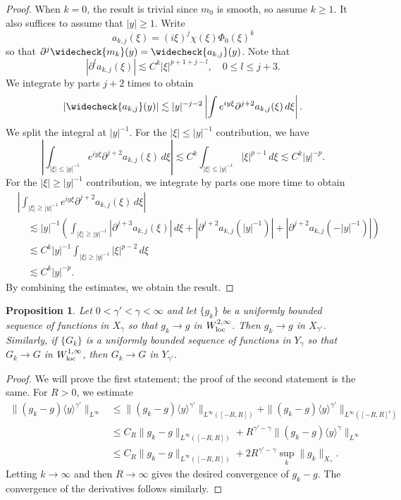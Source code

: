 \documentclass[11pt]{amsart}
\newtheorem{proposition}[theorem]{Proposition}
\theoremstyle{definition}
\theoremstyle{remark}
\numberwithin{equation}{section}
\newcommand{\ang}[1]{\langle #1 \rangle}
\begin{document}
\begin{proof}
    When $k = 0$, the result is trivial since $m_0$ is smooth, so assume $k \geq 1$. It also suffices to assume that $|y| \geq 1$. Write
    \[a_{k,j}(\xi) = (i\xi)^j \chi(\xi)\Phi_0(\xi)^k\]
    so that $\partial^j \widecheck{m_k}(y) = \widecheck{a_{k,j}}(y)$. Note that
    \[|\partial^l a_{k,j}(\xi)| \lesssim C^k |\xi|^{p + 1 + j - l}, \quad 0 \leq l \leq j + 3.\]
    We integrate by parts $j + 2$ times to obtain
    \[|\widecheck{a_{k,j}}(y)| \lesssim |y|^{-j - 2}\left|\int e^{iy\xi}\partial^{j+2}a_{k,j}(\xi)\, d\xi\right|.\]
    We split the integral at $|y|^{-1}$. For the $|\xi| \leq |y|^{-1}$ contribution, we have
    \[\left|\int_{|\xi| \leq |y|^{-1}} e^{iy\xi}\partial^{j+2}a_{k,j}(\xi)\, d\xi\right| \lesssim C^k \int_{|\xi| \leq |y|^{-1}}|\xi|^{p - 1} \, d\xi \lesssim C^k |y|^{-p}.\]
    For the $|\xi| \geq |y|^{-1}$ contribution, we integrate by parts one more time to obtain
    \begin{align*}
        &\left|\int_{|\xi| \geq |y|^{-1}} e^{iy\xi}\partial^{j+2}a_{k,j}(\xi)\, d\xi\right| \\
        &\quad \lesssim |y|^{-1}\left(\int_{|\xi| \geq |y|^{-1}}|\partial^{j+3}a_{k,j}(\xi)|\, d\xi + \left|\partial^{j+2}a_{k,j}(|y|^{-1})\right| + \left|\partial^{j+2}a_{k,j}(-|y|^{-1})\right|\right) \\
        &\quad \lesssim C^k |y|^{-1}\int_{|\xi| \geq |y|^{-1}}|\xi|^{p - 2}\, d\xi \\
        &\quad \lesssim C^k |y|^{-p}.
    \end{align*}
    By combining the estimates, we obtain the result.
\end{proof}

\begin{proposition}\label{prop:appendix_convergence}
    Let $0 < \gamma' < \gamma < \infty$ and let $\{g_k\}$ be a uniformly bounded sequence of functions in $X_{\gamma}$ so that $g_k \to g$ in $W^{2, \infty}_{\textup{loc}}$. Then $g_k \to g$ in $X_{\gamma'}$. Similarly, if $\{G_k\}$ is a uniformly bounded sequence of functions in $Y_{\gamma}$ so that $G_k \to G$ in $W^{1, \infty}_{\textup{loc}}$, then $G_k \to G$ in $Y_{\gamma'}$.
\end{proposition}

\begin{proof}
    We will prove the first statement; the proof of the second statement is the same. For $R > 0$, we estimate
    \begin{align*}
        \|(g_k - g)\ang{y}^{\gamma'}\|_{L^\infty} & \leq \|(g_k - g)\ang{y}^{\gamma'}\|_{L^\infty([-R, R])} + \|(g_k - g)\ang{y}^{\gamma'}\|_{L^\infty([-R, R]^c)} \\
        & \leq C_R\|g_k - g\|_{L^\infty([-R, R])} + R^{\gamma' - \gamma}\|(g_k - g)\ang{y}^{\gamma}\|_{L^\infty} \\
        & \leq C_R\|g_k - g\|_{L^\infty([-R, R])} + 2R^{\gamma' - \gamma}\sup_k\|g_k\|_{X_\gamma}.
    \end{align*}
    Letting $k \to \infty$ and then $R \to \infty$ gives the desired convergence of $g_k - g$. The convergence of the derivatives follows similarly.
\end{proof}
\end{document}
